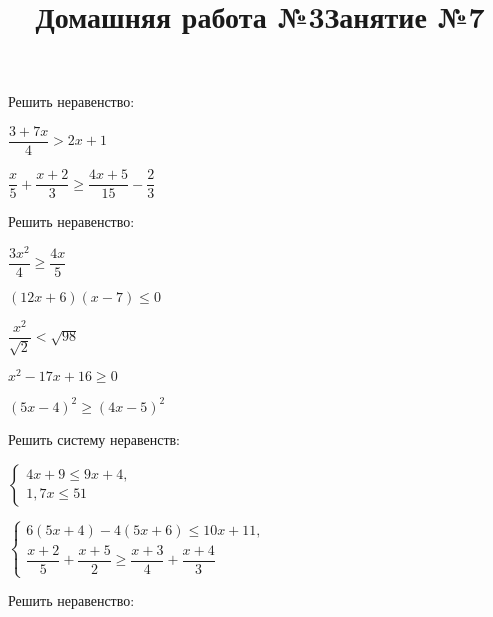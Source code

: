 %	
\newpage
\title{Домашняя работа №3}
\begin{listofex}
	\item Решить неравенство:
	\begin{enumcols}[itemcolumns=2]
		\item \( \dfrac{3+7x}{4}>2x+1 \)
		\item \( \dfrac{x}{5}+\dfrac{x+2}{3}\ge\dfrac{4x+5}{15}-\dfrac{2}{3} \)
	\end{enumcols}
	\item Решить неравенство:
	\begin{enumcols}[itemcolumns=2]
		\item \( \dfrac{3x^2}{4}\ge\dfrac{4x}{5} \)
		\item \( (12x+6)(x-7)\le0 \)
		\item \( \dfrac{x^2}{\sqrt{2}}<\sqrt{98} \)
		\item \( x^2-17x+16\ge0 \)
		\item \( (5x-4)^2\ge(4x-5)^2 \)
	\end{enumcols}
	\item Решить систему неравенств:
	\begin{enumcols}[itemcolumns=2]
		\item \( \left\{
		\begin{array}{l}
			4x+9\le9x+4,\\
			1,7x\le51
		\end{array}
		\right. \) \answer{\( [1;30] \)}
		\item \( \left\{
		\begin{array}{l}
			6(5x+4)-4(5x+6)\le10x+11,\\
			\dfrac{x+2}{5}+\dfrac{x+5}{2}\ge\dfrac{x+3}{4}+\dfrac{x+4}{3}
		\end{array}
		\right. \) \answer{\( [-7;+\infty) \)}
	\end{enumcols}
	\item {}
	\item Решить неравенство:
	\begin{enumcols}[itemcolumns=2]
		\item {}
		\item {}
	\end{enumcols}
\end{listofex}
\newpage
\title{Занятие №7}
